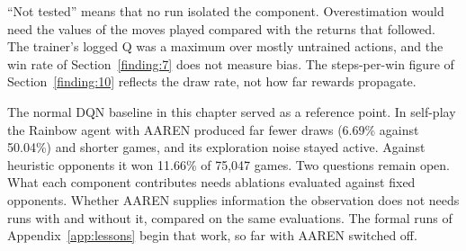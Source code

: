 ``Not tested'' means that no run isolated the component. Overestimation would need the values of the moves played compared with the returns that followed. The trainer's logged Q was a maximum over mostly untrained actions, and the win rate of Section~\ref{finding:7} does not measure bias. The steps-per-win figure of Section~\ref{finding:10} reflects the draw rate, not how far rewards propagate.

The normal DQN baseline in this chapter served as a reference point. In self-play the Rainbow agent with AAREN produced far fewer draws (6.69\% against 50.04\%) and shorter games, and its exploration noise stayed active. Against heuristic opponents it won 11.66\% of 75,047 games. Two questions remain open. What each component contributes needs ablations evaluated against fixed opponents. Whether AAREN supplies information the observation does not needs runs with and without it, compared on the same evaluations. The formal runs of Appendix~\ref{app:lessons} begin that work, so far with AAREN switched off.
